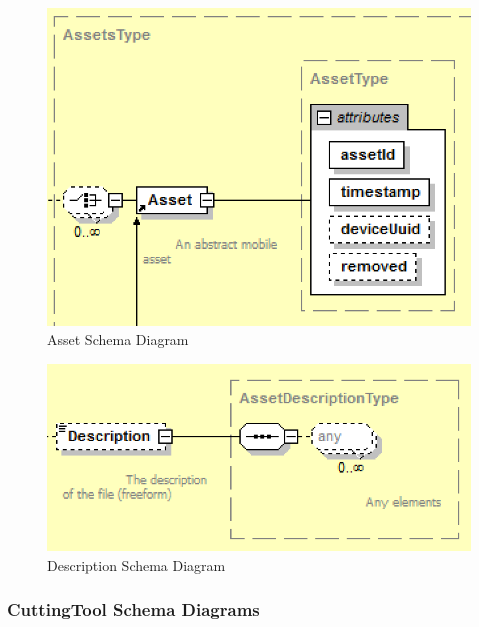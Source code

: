 \begin{figure}[ht]
  \centering
    \includegraphics[width=1.0\textwidth]{figures/Asset Schema.png}
  \caption{Asset Schema Diagram}
  \label{fig:Asset Schema Diagram}
\end{figure}

\FloatBarrier


\begin{figure}[ht]
  \centering
    \includegraphics[width=1.0\textwidth]{figures/Description Schema.png}
  \caption{Description Schema Diagram}
  \label{fig:Description Schema Diagram}
\end{figure}

\FloatBarrier


\subsubsection{CuttingTool Schema Diagrams}
\label{sec:CuttingTool Schema Diagrams}

